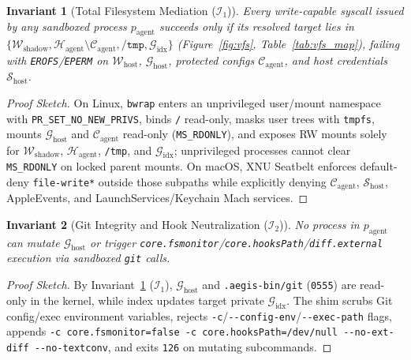 \documentclass[10pt,twocolumn]{article}
\newtheorem{invariant}{Invariant}
\begin{document}
\begin{invariant}[Total Filesystem Mediation ($\mathcal{I}_1$)]
\label{inv:fs}
Every write-capable syscall issued by any sandboxed process $p_{\text{agent}}$ succeeds only if its resolved target lies in $\{\mathcal{W}_{\text{shadow}}, \mathcal{H}_{\text{agent}} \setminus \mathcal{C}_{\text{agent}}, \texttt{/tmp}, \mathcal{G}_{\text{idx}}\}$ (Figure~\ref{fig:vfs}, Table~\ref{tab:vfs_map}), failing with \texttt{EROFS}/\texttt{EPERM} on $\mathcal{W}_{\text{host}}$, $\mathcal{G}_{\text{host}}$, protected configs $\mathcal{C}_{\text{agent}}$, and host credentials $\mathcal{S}_{\text{host}}$.
\end{invariant}
\begin{proof}[Proof Sketch]
On Linux, \texttt{bwrap} enters an unprivileged user/mount namespace with \texttt{PR\_SET\_NO\_NEW\_PRIVS}, binds \texttt{/} read-only, masks user trees with \texttt{tmpfs}, mounts $\mathcal{G}_{\text{host}}$ and $\mathcal{C}_{\text{agent}}$ read-only (\texttt{MS\_RDONLY}), and exposes RW mounts solely for $\mathcal{W}_{\text{shadow}}$, $\mathcal{H}_{\text{agent}}$, \texttt{/tmp}, and $\mathcal{G}_{\text{idx}}$; unprivileged processes cannot clear \texttt{MS\_RDONLY} on locked parent mounts. On macOS, XNU Seatbelt enforces default-deny \texttt{file-write*} outside those subpaths while explicitly denying $\mathcal{C}_{\text{agent}}$, $\mathcal{S}_{\text{host}}$, AppleEvents, and LaunchServices/Keychain Mach services.
\end{proof}

\begin{invariant}[Git Integrity and Hook Neutralization ($\mathcal{I}_2$)]
\label{inv:git}
No process in $p_{\text{agent}}$ can mutate $\mathcal{G}_{\text{host}}$ or trigger \texttt{core.fsmonitor}/\texttt{core.hooksPath}/\texttt{diff.external} execution via sandboxed \texttt{git} calls.
\end{invariant}
\begin{proof}[Proof Sketch]
By Invariant~\ref{inv:fs} ($\mathcal{I}_1$), $\mathcal{G}_{\text{host}}$ and \texttt{.aegis-bin/git} (\texttt{0555}) are read-only in the kernel, while index updates target private $\mathcal{G}_{\text{idx}}$. The shim scrubs Git config/exec environment variables, rejects \texttt{-c}/\texttt{-\/-config-env}/\texttt{-\/-exec-path} flags, appends \texttt{-c core.fsmonitor=false -c core.hooksPath=/dev/null -\/-no-ext-diff -\/-no-textconv}, and exits \texttt{126} on mutating subcommands.
\end{proof}
\end{document}
